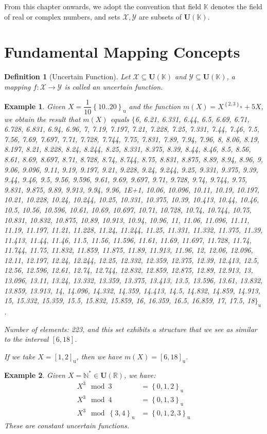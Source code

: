 \documentclass[a4paper,12pt, twoside]{memoir}
\newtheorem{definition}{Definition}[chapter]
\newtheorem{example}{Example}[chapter]
\newcommand{\set}[1]{\left\{#1\right\}} %
\newcommand{\s}[1]{\set{#1}_\mathrm{u}} %
\newcommand{\kbd}[1]{{#1}_\mathrm{u}} %
\newcommand{\tsbd}[1]{\mathbf{U}(\mathbb{#1})}
\begin{document}
From this chapter onwards, we adopt the convention that field $\mathbb{K}$ denotes the field of real or complex numbers, and sets $\mathcal{X}, \mathcal{Y}$ are subsets of $\tsbd{K}$.

\section{Fundamental Mapping Concepts}
\begin{definition}[Uncertain Function]
	Let $\mathcal{X} \subseteq \tsbd{K}$ and $\mathcal{Y} \subseteq \tsbd{K}$, a mapping $f: \mathcal{X} \to \mathcal{Y}$ is called an uncertain function.
\end{definition}

\begin{example}
	Given $X = \dfrac{1}{10}\s{10..20}$ and the function $m(X) = X^{\s{2,3}}+5X$, we obtain the result that $m(X)$ equals
	$\{$6, 6.21, 6.331, 6.44, 6.5, 6.69, 6.71, 6.728, 6.831, 6.94, 6.96, 7, 7.19, 7.197, 7.21, 7.228, 7.25, 7.331, 7.44, 7.46, 7.5, 7.56, 7.69, 7.697, 7.71, 7.728, 7.744, 7.75, 7.831, 7.89, 7.94, 7.96, 8, 8.06, 8.19, 8.197, 8.21, 8.228, 8.24, 8.244, 8.25, 8.331, 8.375, 8.39, 8.44, 8.46, 8.5, 8.56, 8.61, 8.69, 8.697, 8.71, 8.728, 8.74, 8.744, 8.75, 8.831, 8.875, 8.89, 8.94, 8.96, 9, 9.06, 9.096, 9.11, 9.19, 9.197, 9.21, 9.228, 9.24, 9.244, 9.25, 9.331, 9.375, 9.39, 9.44, 9.46, 9.5, 9.56, 9.596, 9.61, 9.69, 9.697, 9.71, 9.728, 9.74, 9.744, 9.75, 9.831, 9.875, 9.89, 9.913, 9.94, 9.96, 1E+1, 10.06, 10.096, 10.11, 10.19, 10.197, 10.21, 10.228, 10.24, 10.244, 10.25, 10.331, 10.375, 10.39, 10.413, 10.44, 10.46, 10.5, 10.56, 10.596, 10.61, 10.69, 10.697, 10.71, 10.728, 10.74, 10.744, 10.75, 10.831, 10.832, 10.875, 10.89, 10.913, 10.94, 10.96, 11, 11.06, 11.096, 11.11, 11.19, 11.197, 11.21, 11.228, 11.24, 11.244, 11.25, 11.331, 11.332, 11.375, 11.39, 11.413, 11.44, 11.46, 11.5, 11.56, 11.596, 11.61, 11.69, 11.697, 11.728, 11.74, 11.744, 11.75, 11.832, 11.859, 11.875, 11.89, 11.913, 11.96, 12, 12.06, 12.096, 12.11, 12.197, 12.24, 12.244, 12.25, 12.332, 12.359, 12.375, 12.39, 12.413, 12.5, 12.56, 12.596, 12.61, 12.74, 12.744, 12.832, 12.859, 12.875, 12.89, 12.913, 13, 13.096, 13.11, 13.24, 13.332, 13.359, 13.375, 13.413, 13.5, 13.596, 13.61, 13.832, 13.859, 13.913, 14, 14.096, 14.332, 14.359, 14.413, 14.5, 14.832, 14.859, 14.913, 15, 15.332, 15.359, 15.5, 15.832, 15.859, 16, 16.359, 16.5, 16.859, 17, 17.5, 18$\}_u$.

	Number of elements: 223, and this set exhibits a structure that we see as similar to the interval $[6,18]$.

	If we take $X = \kbd{[1,2]}$, then we have $m(X) = \kbd{[6,18]}$.
\end{example}
\begin{example}
	Given $X = \mathbb{N^*} \in \tsbd{R}$, we have:
	\begin{align*}
		X^3 \mod 3       & = \s{0,1,2}   \\
		X^3 \mod 4       & = \s{0,1,3}   \\
		X^3 \mod \s{3,4} & = \s{0,1,2,3}
	\end{align*}
	These are constant uncertain functions.
\end{example}
\end{document}
